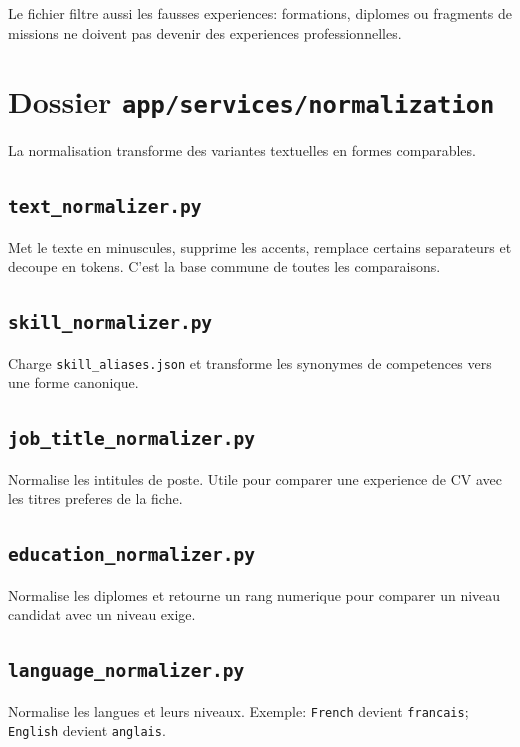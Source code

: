 \documentclass[12pt,a4paper]{article}
\begin{document}
Le fichier filtre aussi les fausses experiences: formations, diplomes ou fragments de missions ne doivent pas devenir des experiences professionnelles.

\section{Dossier \texttt{app/services/normalization}}

La normalisation transforme des variantes textuelles en formes comparables.

\subsection{\texttt{text\_normalizer.py}}

Met le texte en minuscules, supprime les accents, remplace certains separateurs et decoupe en tokens. C'est la base commune de toutes les comparaisons.

\subsection{\texttt{skill\_normalizer.py}}

Charge \texttt{skill\_aliases.json} et transforme les synonymes de competences vers une forme canonique.

\subsection{\texttt{job\_title\_normalizer.py}}

Normalise les intitules de poste. Utile pour comparer une experience de CV avec les titres preferes de la fiche.

\subsection{\texttt{education\_normalizer.py}}

Normalise les diplomes et retourne un rang numerique pour comparer un niveau candidat avec un niveau exige.

\subsection{\texttt{language\_normalizer.py}}

Normalise les langues et leurs niveaux. Exemple: \texttt{French} devient \texttt{francais}; \texttt{English} devient \texttt{anglais}.
\end{document}

